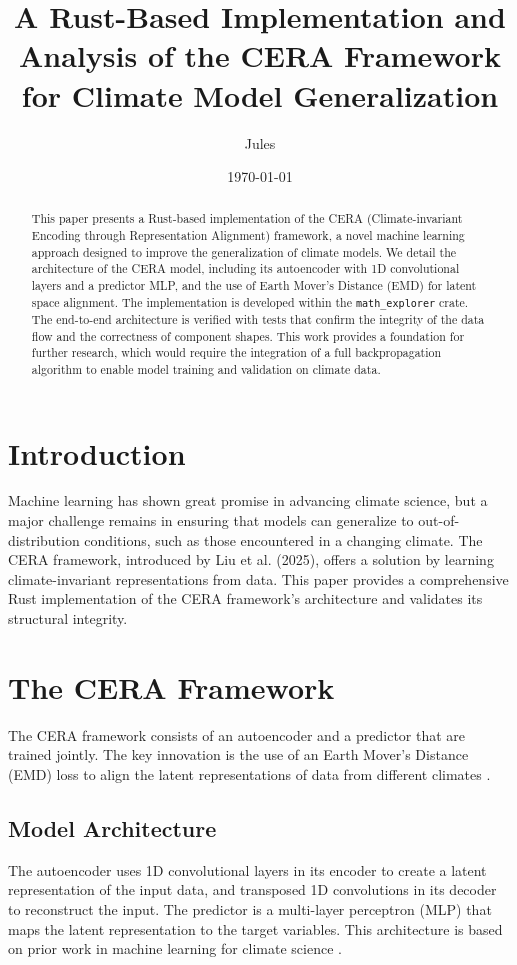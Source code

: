 \documentclass{article}
\title{A Rust-Based Implementation and Analysis of the CERA Framework for Climate Model Generalization}
\author{Jules}
\date{\today}
\begin{document}
\maketitle

\begin{abstract}
This paper presents a Rust-based implementation of the CERA (Climate-invariant Encoding through Representation Alignment) framework, a novel machine learning approach designed to improve the generalization of climate models. We detail the architecture of the CERA model, including its autoencoder with 1D convolutional layers and a predictor MLP, and the use of Earth Mover's Distance (EMD) for latent space alignment. The implementation is developed within the \texttt{math\_explorer} crate. The end-to-end architecture is verified with tests that confirm the integrity of the data flow and the correctness of component shapes. This work provides a foundation for further research, which would require the integration of a full backpropagation algorithm to enable model training and validation on climate data.
\end{abstract}

\section{Introduction}
Machine learning has shown great promise in advancing climate science, but a major challenge remains in ensuring that models can generalize to out-of-distribution conditions, such as those encountered in a changing climate. The CERA framework, introduced by Liu et al. (2025), offers a solution by learning climate-invariant representations from data. This paper provides a comprehensive Rust implementation of the CERA framework's architecture and validates its structural integrity.

\section{The CERA Framework}
The CERA framework consists of an autoencoder and a predictor that are trained jointly. The key innovation is the use of an Earth Mover's Distance (EMD) loss to align the latent representations of data from different climates \cite{Rubner2000TheRetrieval}.

\subsection{Model Architecture}
The autoencoder uses 1D convolutional layers in its encoder to create a latent representation of the input data, and transposed 1D convolutions in its decoder to reconstruct the input. The predictor is a multi-layer perceptron (MLP) that maps the latent representation to the target variables. This architecture is based on prior work in machine learning for climate science \cite{Yuval2021UsePrecision, Beucler2024Climate-invariantLearning}.
\end{document}

